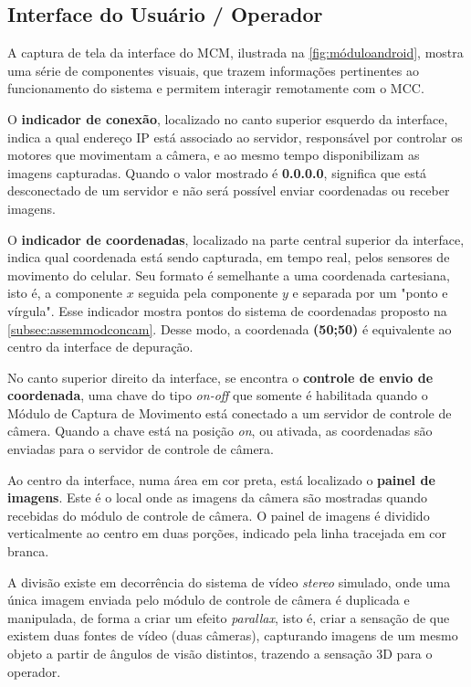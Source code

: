\subsection{Interface do Usuário / Operador}
\label{subsec:interfaceusuariooperador}

A captura de tela da interface do MCM, ilustrada na \autoref{fig:móduloandroid}, mostra uma série de componentes visuais, que trazem informações pertinentes ao funcionamento do sistema e permitem interagir remotamente com o MCC. \par

O \textbf{indicador de conexão}, localizado no canto superior esquerdo da interface, indica a qual endereço IP está associado ao servidor, responsável por controlar os motores que movimentam a câmera, e ao mesmo tempo disponibilizam as imagens capturadas. Quando o valor mostrado é \textbf{0.0.0.0}, significa que está desconectado de um servidor e não será possível enviar coordenadas ou receber imagens.\par

O \textbf{indicador de coordenadas}, localizado na parte central superior da interface, indica qual coordenada está sendo capturada, em tempo real, pelos sensores de movimento do celular. Seu formato é semelhante a uma coordenada cartesiana, isto é, a componente $x$ seguida pela componente $y$ e separada por um "ponto e vírgula". Esse indicador mostra pontos do sistema de coordenadas proposto na \autoref{subsec:assemmodconcam}. Desse modo, a coordenada \textbf{(50;50)} é equivalente ao centro da interface de depuração.\par

No canto superior direito da interface, se encontra o \textbf{controle de envio de coordenada}, uma chave do tipo \textit{on-off} que somente é habilitada quando o Módulo de Captura de Movimento está conectado a um servidor de controle de câmera. Quando a chave está na posição \textit{on}, ou ativada, as coordenadas são enviadas para o servidor de controle de câmera.\par

Ao centro da interface, numa área em cor preta, está localizado o \textbf{painel de imagens}. Este é o local onde as imagens da câmera são mostradas quando recebidas do módulo de controle de câmera. O painel de imagens é dividido verticalmente ao centro em duas porções, indicado pela linha tracejada em cor branca.\par

A divisão existe em decorrência do sistema de vídeo \textit{stereo} simulado, onde uma única imagem enviada pelo módulo de controle de câmera é duplicada e manipulada, de forma a criar um efeito \textit{parallax}, isto é, criar a sensação de que existem duas fontes de vídeo (duas câmeras), capturando imagens de um mesmo objeto a partir de ângulos de visão distintos, trazendo a sensação 3D para o operador.\par


